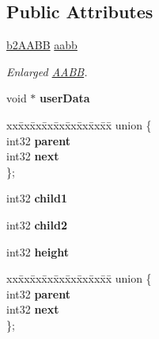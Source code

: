 \subsection*{Public Attributes}
\begin{DoxyCompactItemize}
\item 
\mbox{\label{structb2TreeNode_a798f1a594b33c713be45e76e79912239}} 
\hyperlink{structb2AABB}{b2\+A\+A\+BB} \hyperlink{structb2TreeNode_a798f1a594b33c713be45e76e79912239}{aabb}
\begin{DoxyCompactList}\small\item\em Enlarged \hyperlink{classAABB}{A\+A\+BB}. \end{DoxyCompactList}\item 
\mbox{\label{structb2TreeNode_a80040f062051f0f913056aa2a241cae0}} 
void $\ast$ {\bfseries user\+Data}
\item 
\mbox{\label{structb2TreeNode_abfad53a9de0e121a2c87e0024149e4c8}} 
\begin{tabbing}
xx\=xx\=xx\=xx\=xx\=xx\=xx\=xx\=xx\=\kill
union \{\\
\>int32 {\bfseries parent}\\
\>int32 {\bfseries next}\\
\}; \\

\end{tabbing}\item 
\mbox{\label{structb2TreeNode_a3a320f2afc7d223e92ee3629602be5ca}} 
int32 {\bfseries child1}
\item 
\mbox{\label{structb2TreeNode_aa6774ce329715b20d8b7cc8b6e3d50bc}} 
int32 {\bfseries child2}
\item 
\mbox{\label{structb2TreeNode_acd183ac94a8d44195c787111be4c22e2}} 
int32 {\bfseries height}
\item 
\mbox{\label{structb2TreeNode_a7b4dc278560cc7d68c26f14d7e60473e}} 
\begin{tabbing}
xx\=xx\=xx\=xx\=xx\=xx\=xx\=xx\=xx\=\kill
union \{\\
\>int32 {\bfseries parent}\\
\>int32 {\bfseries next}\\
\}; \\

\end{tabbing}\end{DoxyCompactItemize}


